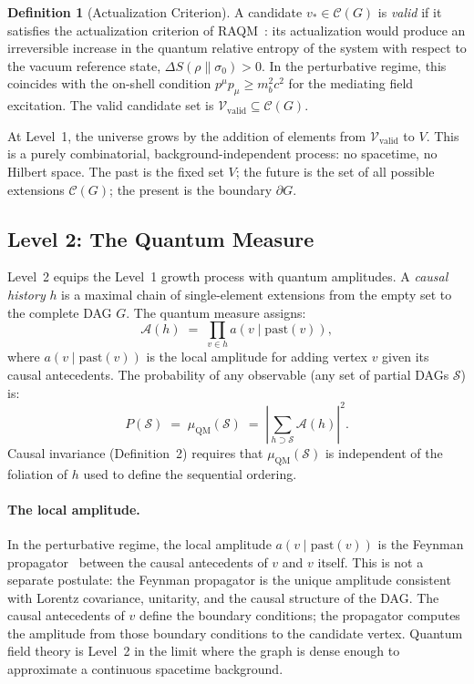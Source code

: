 \documentclass[11pt,a4paper]{article}
\theoremstyle{plain}
\theoremstyle{definition}
\newtheorem{definition}[theorem]{Definition}
\theoremstyle{remark}
\newcommand{\Vvalid}{\mathcal{V}_{\mathrm{valid}}}
\newcommand{\muC}{\mu_{\mathrm{QM}}}   %
\begin{document}
\begin{definition}[Actualization Criterion]
A candidate $v_* \in \mathcal{C}(G)$ is \emph{valid} if it satisfies the
actualization criterion of RAQM~\citep{Sandeman2026a}: its actualization would
produce an irreversible increase in the quantum relative entropy of the system
with respect to the vacuum reference state, $\Delta S(\rho\|\sigma_0) > 0$.
In the perturbative regime, this coincides with the on-shell condition
$p^\mu p_\mu \geq m_b^2 c^2$ for the mediating field excitation. The valid
candidate set is $\Vvalid \subseteq \mathcal{C}(G)$.
\end{definition}

At Level~1, the universe grows by the addition of elements from $\Vvalid$ to
$V$. This is a purely combinatorial, background-independent process: no
spacetime, no Hilbert space. The past is the fixed set $V$; the future is the
set of all possible extensions $\mathcal{C}(G)$; the present is the boundary
$\partial G$.

\subsection{Level 2: The Quantum Measure}

Level~2 equips the Level~1 growth process with quantum amplitudes. A
\emph{causal history} $h$ is a maximal chain of single-element extensions
from the empty set to the complete DAG $G$. The quantum measure assigns:
\begin{equation}
  \mathcal{A}(h) \;=\; \prod_{v \in h} a(v \mid \mathrm{past}(v)),
  \label{eq:local_amplitude}
\end{equation}
where $a(v \mid \mathrm{past}(v))$ is the local amplitude for adding vertex
$v$ given its causal antecedents. The probability of any observable
(any set of partial DAGs $\mathcal{S}$) is:
\begin{equation}
  P(\mathcal{S}) \;=\; \muC(\mathcal{S})
  \;=\; \left|\sum_{h \supset \mathcal{S}} \mathcal{A}(h)\right|^2.
  \label{eq:qm_probability}
\end{equation}
Causal invariance (Definition~2) requires that $\muC(\mathcal{S})$ is
independent of the foliation of $h$ used to define the sequential ordering.

\paragraph{The local amplitude.}
In the perturbative regime, the local amplitude $a(v \mid \mathrm{past}(v))$
is the Feynman propagator~\citep{Feynman1948} between the causal antecedents of $v$ and $v$ itself.
This is not a separate postulate: the Feynman propagator is the unique
amplitude consistent with Lorentz covariance, unitarity, and the causal
structure of the DAG. The causal antecedents of $v$ define the boundary
conditions; the propagator computes the amplitude from those boundary conditions
to the candidate vertex. Quantum field theory is Level~2 in the limit where
the graph is dense enough to approximate a continuous spacetime background.
\end{document}
